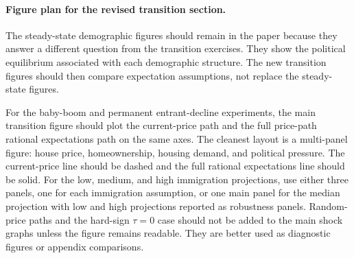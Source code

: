 
{\color{blue}
\paragraph{Figure plan for the revised transition section.}
The steady-state demographic figures should remain in the paper because they answer a different question from the transition exercises. They show the political equilibrium associated with each demographic structure. The new transition figures should then compare expectation assumptions, not replace the steady-state figures.

For the baby-boom and permanent entrant-decline experiments, the main transition figure should plot the current-price path and the full price-path rational expectations path on the same axes. The cleanest layout is a multi-panel figure: house price, homeownership, housing demand, and political pressure. The current-price line should be dashed and the full rational expectations line should be solid. For the low, medium, and high immigration projections, use either three panels, one for each immigration assumption, or one main panel for the median projection with low and high projections reported as robustness panels. Random-price paths and the hard-sign $\tau=0$ case should not be added to the main shock graphs unless the figure remains readable. They are better used as diagnostic figures or appendix comparisons.
}

